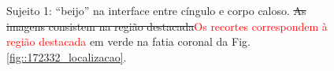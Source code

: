   \begin{figure}[H]
\centering
    \hfill
    \caption{Sujeito 1: ``beijo'' na interface entre cíngulo e corpo caloso. \sout{As imagens consistem na região destacada}\textcolor{red}{Os recortes correspondem à região destacada} em verde na fatia coronal da Fig. \ref{fig::172332_localizacao}.
    }
    \label{fig::172332_kissing}
\end{figure}




